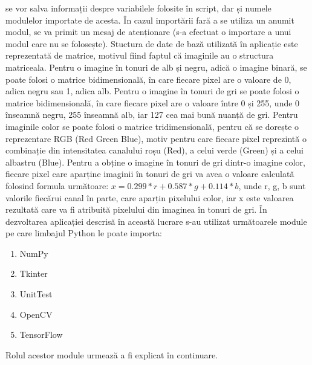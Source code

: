 \documentclass[a4paper,12pt]{report}
\newcommand\tab[1][1cm]{\hspace*{#1}}
\begin{document}
se vor salva informații despre variabilele folosite în script, dar și numele modulelor importate de acesta. În cazul importării fară a se utiliza un anumit modul,
se va primit un mesaj de atenționare (s-a efectuat o importare a unui modul care nu se folosește).
\newline
\tab Stuctura de date de bază utilizată în aplicație este reprezentată de matrice, motivul fiind faptul că imaginile au o structura matriceala. Pentru 
o imagine în tonuri de alb și negru, adică o imagine binară, se poate folosi o matrice bidimensională, în care fiecare pixel are o valoare de 0, adica negru 
sau 1, adica alb. Pentru o imagine în tonuri de gri se poate folosi o matrice bidimensională, în care fiecare pixel are o valoare între 0 și 255, unde 0 
înseamnă negru, 255 înseamnă alb, iar 127 cea mai bună nuanță de gri. Pentru imaginile color se poate folosi o matrice tridimensională, pentru că
se dorește o reprezentare RGB (Red Green Blue), motiv pentru care fiecare pixel reprezintă o combinație din intensitatea canalului roșu (Red), a celui
verde (Green) și a celui albastru (Blue). Pentru a obține o imagine în tonuri de gri dintr-o imagine color, fiecare pixel care aparține imaginii în 
tonuri de gri va avea o valoare calculată folosind formula următoare: $x=0.299*r+0.587*g+0.114*b$, unde r, g, b sunt valorile fiecărui canal în parte, care 
aparțin pixelului color, iar x este valoarea rezultată care va fi atribuită pixelului din imaginea în tonuri de gri.
\newline
\tab În dezvoltarea aplicației descrisă în această lucrare s-au utilizat următoarele module pe care limbajul Python le poate importa:
	\begin{enumerate}
	\setlength\itemsep{1pt}
	\item NumPy
	\item Tkinter
	\item UnitTest
	\item OpenCV
	\item TensorFlow
	\end{enumerate}
\tab Rolul acestor module urmează a fi explicat în continuare.
\end{document}
